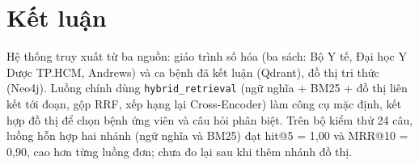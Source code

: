 \section{Kết luận}

Hệ thống truy xuất từ ba nguồn: giáo trình số hóa (ba sách: Bộ Y tế, Đại học Y Dược TP.HCM, Andrews) và ca bệnh đã kết luận (Qdrant), đồ thị tri thức (Neo4j). Luồng chính dùng \texttt{hybrid\_retrieval} (ngữ nghĩa + BM25 + đồ thị liên kết tới đoạn, gộp RRF, xếp hạng lại Cross-Encoder) làm công cụ mặc định, kết hợp đồ thị để chọn bệnh ứng viên và câu hỏi phân biệt. Trên bộ kiểm thử 24 câu, luồng hỗn hợp hai nhánh (ngữ nghĩa và BM25) đạt hit@5 = 1,00 và MRR@10 = 0,90, cao hơn từng luồng đơn; chưa đo lại sau khi thêm nhánh đồ thị.
